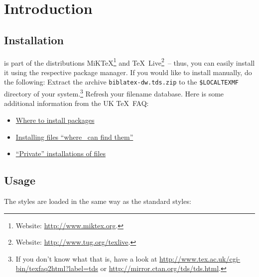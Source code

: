\documentclass[english]{scrartcl}
\begin{document}
\maketitle
\thispagestyle{empty}


\lizenz
\screenversion
\TOC

\section{Introduction}
\subsection{Installation}
\bldw{} is part of the distributions MiK\TeX{}\footnote{Website: \url{http://www.miktex.org}.} 
and \TeX{}~Live\footnote{Website: \url{http://www.tug.org/texlive}.}~-- thus, you
can easily install it using the respective package manager. If you would like to
install \bldw{} manually, do the following:
Extract the archive \texttt{biblatex-dw.tds.zip} to the \texttt{\$LOCALTEXMF} directory of
 your system.\footnote{If you don't know what that is, have a look at
\url{http://www.tex.ac.uk/cgi-bin/texfaq2html?label=tds} or 
\url{http://mirror.ctan.org/tds/tds.html}.} Refresh your filename database. 
Here is some additional information from the UK \TeX\ FAQ:
\begin{itemize}
	\item \href{%
    http://www.tex.ac.uk/cgi-bin/texfaq2html?label=install-where}{%
    Where to install packages}
	\item \href{%
	  http://www.tex.ac.uk/cgi-bin/texfaq2html?label=inst-wlcf}{%
	  Installing files \enquote{where \LaTeXTeX\ can find them}}
	\item \href{%
	  http://www.tex.ac.uk/cgi-bin/texfaq2html?label=privinst}{%
	  \enquote{Private} installations of files}
\end{itemize}

\subsection{Usage}
The styles are loaded in the same way as the \bl{} standard styles:
 
\end{document}
